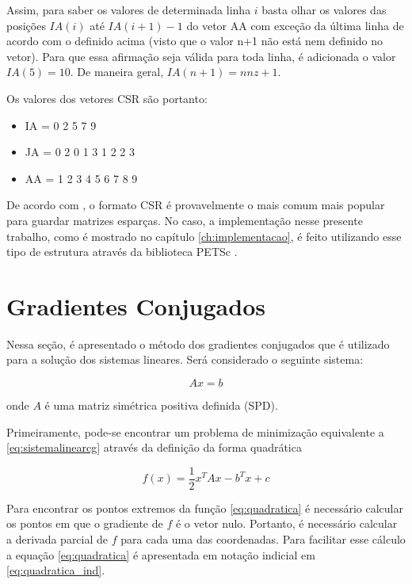 Assim, para saber os valores de determinada linha $i$ basta olhar os valores das posições $IA(i)$ até $IA(i+1)-1$ do vetor AA com exceção da última linha de acordo com o definido acima (visto que o valor n+1 não está nem definido no vetor). Para que essa afirmação seja válida para toda linha, é adicionada o valor $IA(5) = 10$. De maneira geral, $IA(n+1) = nnz+1$.


Os valores dos vetores CSR são portanto:

\begin{center}
    \begin{itemize}
        \item IA = 0 2 5 7 9
        \item JA = 0 2 0 1 3 1 2 2 3
        \item AA = 1 2 3 4 5 6 7 8 9
    \end{itemize}
\end{center}


De acordo com \cite{solverlinear}, o formato CSR é provavelmente o mais comum mais popular para guardar matrizes esparças. No caso, a implementação nesse presente trabalho, como é mostrado no capítulo \ref{ch:implementacao}, é feito utilizando esse tipo de estrutura através da biblioteca PETSc \textcopyright.


\section{Gradientes Conjugados} \label{sec:cg}

Nessa seção, é apresentado o método dos gradientes conjugados que é utilizado para a solução dos sistemas lineares. Será considerado o seguinte sistema:

\begin{equation} \label{eq:sistemalinearcg}
    Ax = b
\end{equation}

onde $A$ é uma matriz simétrica positiva definida (SPD).


Primeiramente, pode-se encontrar um problema de minimização equivalente a \ref{eq:sistemalinearcg} através da definição da forma quadrática

\begin{equation} \label{eq:quadratica}
    f(x) = \frac{1}{2}  x^T A x - b^T x + c
\end{equation}

Para encontrar os pontos extremos da função \ref{eq:quadratica} é necessário calcular os pontos em que o gradiente de $f$ é o vetor nulo. Portanto, é necessário calcular a derivada parcial de $f$ para cada uma das coordenadas. Para facilitar esse cálculo a equação \ref{eq:quadratica} é apresentada em notação indicial em \ref{eq:quadratica_ind}.


